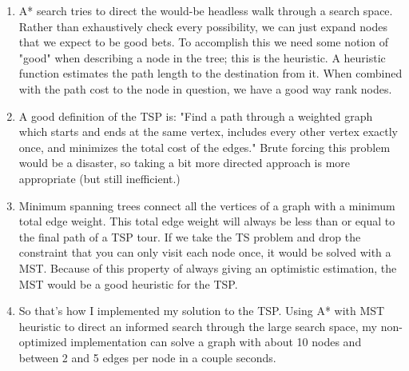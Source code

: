 \documentclass[a4paper,12pt]{article}
\begin{document}
\begin{enumerate}[]
\item A* search tries to direct the would-be headless walk through a
  search space. Rather than exhaustively check every possibility, we
  can just expand nodes that we expect to be good bets. To accomplish
  this we need some notion of "good" when describing a node in the
  tree; this is the heuristic. A heuristic function estimates the path
  length to the destination from it. When combined with the path cost
  to the node in question, we have a good way rank nodes.

\item A good definition of the TSP is: "Find a path through a weighted
  graph which starts and ends at the same vertex, includes every other
  vertex exactly once, and minimizes the total cost of the edges."
  Brute forcing this problem would be a disaster, so taking a bit more
  directed approach is more appropriate (but still inefficient.)

\item Minimum spanning trees connect all the vertices of a graph with
  a minimum total edge weight. This total edge weight will always be
  less than or equal to the final path of a TSP tour. If we take the
  TS problem and drop the constraint that you can only visit each node
  once, it would be solved with a MST. Because of this property of
  always giving an optimistic estimation, the MST would be a good
  heuristic for the TSP.

\item So that's how I implemented my solution to the TSP. Using A*
  with MST heuristic to direct an informed search through the large
  search space, my non-optimized implementation can solve a graph with
  about 10 nodes and between 2 and 5 edges per node in a couple
  seconds.

\end{enumerate}
\end{document}
